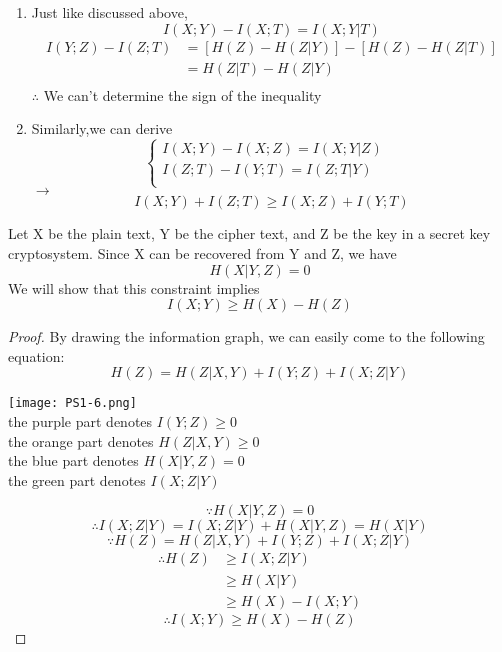 \documentclass[12pt]{article}
\newenvironment{solution}[2][Solution]{\begin{trivlist}
\item[\hskip \labelsep {\bfseries #1}]}{\end{trivlist}}
\newenvironment{problem}[2][Problem]{\begin{trivlist}
\item[\hskip \labelsep {\bfseries #1}\hskip \labelsep {\bfseries #2.}]}{\end{trivlist}}
\begin{document}
\begin{solution}{}
\begin{enumerate}[label=\roman*]
        \item
        Just like discussed above,
        $$I(X;Y)-I(X;T)=I(X;Y|T)$$
        \begin{align*}
            I(Y;Z)-I(Z;T) &= [H(Z)-H(Z|Y)]-[H(Z)-H(Z|T)]\\
                          &= H(Z|T)-H(Z|Y)\\
        \end{align*}
        $\therefore$ We can't determine the sign of the inequality\\
        \item
        Similarly,we can derive
        \begin{equation}  
        \left\{  
             \begin{array}{lr}  
             I(X;Y)-I(X;Z)=I(X;Y|Z) &  \\  
             I(Z;T)-I(Y;T)=I(Z;T|Y) &  \\  
             \end{array}  
        \right.  
        \end{equation} 
        $\longrightarrow$
        \begin{equation}
            I(X;Y)+I(Z;T)\geq I(X;Z)+I(Y;T)
        \end{equation}
    \end{enumerate}
\end{solution}
\newpage
\begin{problem}{9 Imperfect secrecy theorem}
    \item
    Let X be the plain text, Y be the cipher text, and Z be the key in a secret key cryptosystem. Since X can be recovered from Y and Z, we have
    $$H(X|Y,Z)=0$$
    We will show that this constraint implies 
    $$I(X;Y)\geq H(X)-H(Z)$$
\end{problem}

\begin{proof}
    \item
    By drawing the information graph, we can easily come to the following equation:
    \begin{equation}
        H(Z)= H(Z|X,Y)+I(Y;Z)+I(X;Z|Y)
    \end{equation}
    \begin{center}
        \texttt{[image: PS1-6.png]}\\
        the purple part denotes $I(Y;Z)\geq0$\\
        the orange part denotes $H(Z|X,Y)\geq0$\\
        the blue part denotes $H(X|Y,Z)=0$\\
        the green part denotes $I(X;Z|Y)$
    \end{center}
    $$\because H(X|Y,Z)=0$$
    $$\therefore I(X;Z|Y)=I(X;Z|Y)+H(X|Y,Z)=H(X|Y)$$
    $$\because H(Z)= H(Z|X,Y)+I(Y;Z)+I(X;Z|Y)$$
    \begin{align*}
    \therefore
        H(Z) &\geq I(X;Z|Y) \\
            &\geq H(X|Y) \\
            &\geq H(X)-I(X;Y)
    \end{align*}
    $$\therefore I(X;Y)\geq H(X)-H(Z)$$
\end{proof}{}

\pagebreak
\end{document}

